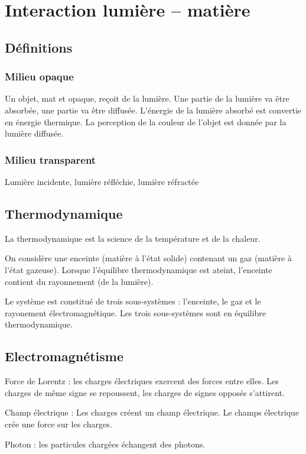 \section{Interaction lumière -- matière}

\subsection{Définitions}

\subsubsection{Milieu opaque}
Un objet, mat et opaque, reçoit de la lumière. Une partie de la lumière va être absorbée, une partie va être  diffusée. L'énergie de la lumière absorbé est convertie en énergie thermique. La perception de la couleur de l'objet est donnée par la lumière diffusée.



\subsubsection{Milieu transparent}
Lumière incidente, lumière réfléchie, lumière réfractée



%


\subsection{Thermodynamique}
La thermodynamique est la science de la température et de la chaleur.


On considère une enceinte (matière à l'état solide) contenant un gaz (matière à l'état gazeuse). Lorsque l'équilibre thermodynamique est ateint, l'enceinte contient du rayonnement (de la lumière).

Le système est constitué de trois sous-systèmes : l'enceinte, le gaz et le rayonement électromagnétique. Les trois sous-systèmes sont en équilibre thermodynamique.

\subsection{Electromagnétisme}
Force de Lorentz : les charges électriques exercent des forces entre elles. Les charges de même signe se repoussent, les charges de signes opposés s'attirent.

Champ électrique : Les charges créent un champ électrique. Le champs électrique crée une force sur les charges.

Photon : les particules chargées échangent des photons.
